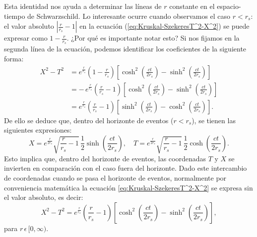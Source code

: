 \noindent
Esta identidad nos ayuda a determinar las líneas de \(r\) constante en el espacio-tiempo de Schwarzschild. Lo interesante ocurre cuando observamos el caso \(r < r_s\): el valor absoluto \(\left|\frac{r}{r_s}-1\right|\) en la ecuación (\ref{eq:Kruskal-SzekeresT^2-X^2}) se puede expresar como \(1-\frac{r}{r_s}\). ¿Por qué es importante notar esto? Si nos fijamos en la segunda línea de la ecuación, podemos identificar los coeficientes de la siguiente forma:
\begin{equation}
    \begin{aligned}
        X^2 -  T^2 & = e^{\frac{r}{r_s}} \left(1-\frac{r}{r_s}\right) \left[ \cosh^2\left(\frac{ct}{2r_s}\right) - \sinh^2\left(\frac{ct}{2r_s}\right) \right]     \\
                   & = -\, e^{\frac{r}{r_s}} \left(\frac{r}{r_s}-1\right) \left[ \cosh^2\left(\frac{ct}{2r_s}\right) - \sinh^2\left(\frac{ct}{2r_s}\right) \right] \\
                   & = e^{\frac{r}{r_s}} \left(\frac{r}{r_s}-1\right) \left[ \sinh^2\left(\frac{ct}{2r_s}\right) - \cosh^2\left(\frac{ct}{2r_s}\right) \right].
    \end{aligned}
\end{equation}
De ello se deduce que, dentro del horizonte de eventos (\(r < r_s\)), se tienen las siguientes expresiones:
\begin{equation}
    X = e^{\frac{r}{2r_s}} \sqrt{\frac{r}{r_s}-1} \, \frac{1}{2} \sinh\left(\frac{ct}{2r_s}\right), \quad
    T = e^{\frac{r}{2r_s}} \sqrt{\frac{r}{r_s}-1} \, \frac{1}{2} \cosh\left(\frac{ct}{2r_s}\right).
\end{equation}
Esto implica que, dentro del horizonte de eventos, las coordenadas \(T\) y \(X\) se invierten en comparación con el caso fuera del horizonte. Dado este intercambio de coordenadas cuando se pasa el horizonte de eventos, normalmente por conveniencia matemática la ecuación \ref{eq:Kruskal-SzekeresT^2-X^2} se expresa sin el valor absoluto, es decir:
\begin{equation}
    X^2 - T^2 = e^{\frac{r}{r_s}} \left(\frac{r}{r_s}-1\right) \left[ \cosh^2\left(\frac{ct}{2r_s}\right) - \sinh^2\left(\frac{ct}{2r_s}\right) \right],
\end{equation}
para $r \, \epsilon \, [0,\infty ) $.


